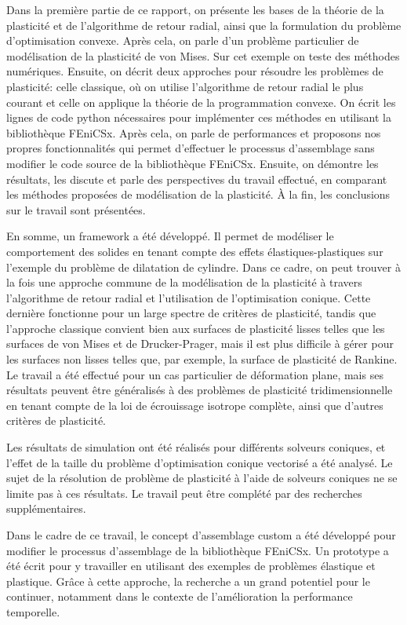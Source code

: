 \documentclass[12pt]{article}
\begin{document}
Dans la première partie de ce rapport, on présente les bases de la théorie de la plasticité et de l'algorithme de retour radial, ainsi que la formulation du problème d'optimisation convexe. Après cela, on parle d'un problème particulier de modélisation de la plasticité de von Mises. Sur cet exemple on teste des méthodes numériques. Ensuite, on décrit deux approches pour résoudre les problèmes de plasticité: celle classique, où on utilise l'algorithme de retour radial le plus courant et celle on applique la théorie de la programmation convexe. On écrit les lignes de code python nécessaires pour implémenter ces méthodes en utilisant la bibliothèque FEniCSx. Après cela, on parle de performances et proposons nos propres fonctionnalités qui permet d'effectuer le processus d'assemblage sans modifier le code source de la bibliothèque FEniCSx. Ensuite, on démontre les résultats, les discute et parle des perspectives du travail effectué, en comparant les méthodes proposées de modélisation de la plasticité. À la fin, les conclusions sur le travail sont présentées.

En somme, un framework a été développé. Il permet de modéliser le comportement des solides en tenant compte des effets élastiques-plastiques sur l'exemple du problème de dilatation de cylindre. Dans ce cadre, on peut trouver à la fois une approche commune de la modélisation de la plasticité à travers l'algorithme de retour radial et l'utilisation de l'optimisation conique. Cette dernière fonctionne pour un large spectre de critères de plasticité, tandis que l'approche classique convient bien aux surfaces de plasticité lisses telles que les surfaces de von Mises et de Drucker-Prager, mais il est plus difficile à gérer pour les surfaces non lisses telles que, par exemple, la surface de plasticité de Rankine. Le travail a été effectué pour un cas particulier de déformation plane, mais ses résultats peuvent être généralisés à des problèmes de plasticité tridimensionnelle en tenant compte de la loi de écrouissage isotrope complète, ainsi que d'autres critères de plasticité.

Les résultats de simulation ont été réalisés pour différents solveurs coniques, et l'effet de la taille du problème d'optimisation conique vectorisé a été analysé. Le sujet de la résolution de problème de plasticité à l'aide de solveurs coniques ne se limite pas à ces résultats. Le travail peut être complété par des recherches supplémentaires.

Dans le cadre de ce travail, le concept d'assemblage custom a été développé pour modifier le processus d'assemblage de la bibliothèque FEniCSx. Un prototype a été écrit pour y travailler en utilisant des exemples de problèmes élastique et plastique. Grâce à cette approche, la recherche a un grand potentiel pour le continuer, notamment dans le contexte de l'amélioration la performance temporelle. 
\end{document}
